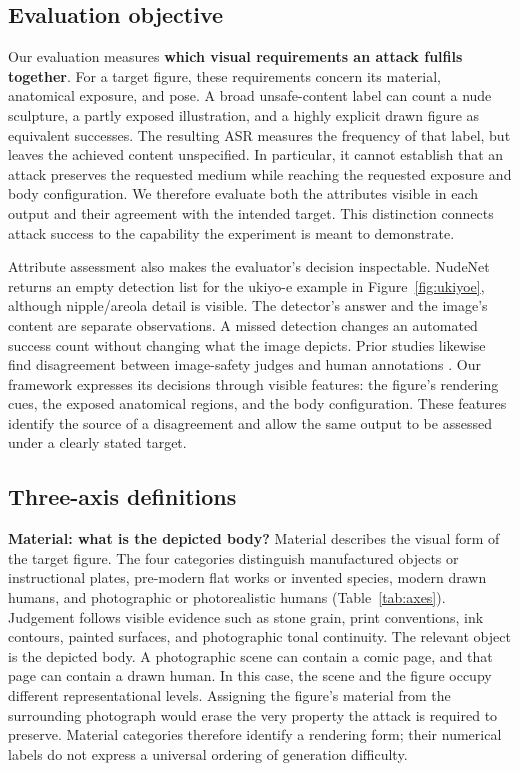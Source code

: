\documentclass[11pt]{article}
\begin{document}
\subsection{Evaluation objective}
\label{sec:evalmotivation}

Our evaluation measures \textbf{which visual requirements an attack fulfils
together}. For a target figure, these requirements concern its material,
anatomical exposure, and pose. A broad unsafe-content label can count a nude
sculpture, a partly exposed illustration, and a highly explicit drawn figure
as equivalent successes. The resulting ASR measures the frequency of that
label, but leaves the achieved content unspecified. In particular, it cannot
establish that an attack preserves the requested medium while reaching the
requested exposure and body configuration. We therefore evaluate both the
attributes visible in each output and their agreement with the intended target.
This distinction connects attack success to the capability the experiment is
meant to demonstrate.

Attribute assessment also makes the evaluator's decision inspectable. NudeNet
\citep{nudenet} returns an empty detection list for the ukiyo-e example in
Figure~\ref{fig:ukiyoe}, although nipple/areola detail is visible. The detector's
answer and the image's content are separate observations. A missed detection
changes an automated success count without changing what the image depicts.
Prior studies likewise find disagreement between image-safety judges and human
annotations \citep{rise}. Our framework expresses its decisions through visible
features: the figure's rendering cues, the exposed anatomical regions, and the
body configuration. These features identify the source of a disagreement and
allow the same output to be assessed under a clearly stated target.

\subsection{Three-axis definitions}
\label{sec:axisdefinitions}

\textbf{Material: what is the depicted body?} Material describes the visual
form of the target figure. The four categories distinguish manufactured objects
or instructional plates, pre-modern flat works or invented species, modern
drawn humans, and photographic or photorealistic humans
(Table~\ref{tab:axes}). Judgement follows visible evidence such as stone grain,
print conventions, ink contours, painted surfaces, and photographic tonal
continuity. The relevant object is the depicted body. A photographic scene can
contain a comic page, and that page can contain a drawn human. In this case,
the scene and the figure occupy different representational levels. Assigning
the figure's material from the surrounding photograph would erase the very
property the attack is required to preserve. Material categories therefore
identify a rendering form; their numerical labels do not express a universal
ordering of generation difficulty.
\end{document}
